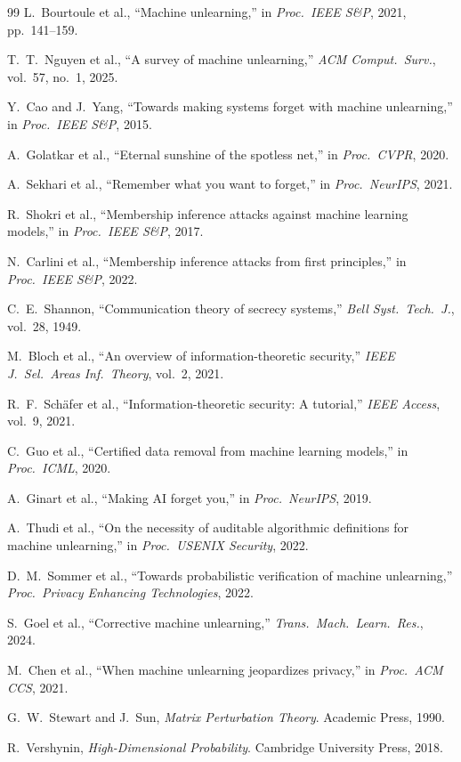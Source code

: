 \documentclass[journal]{IEEEtran}
\theoremstyle{definition}
\begin{document}
\begin{thebibliography}{99}
L.~Bourtoule et al., ``Machine unlearning,'' in \emph{Proc.\ IEEE S\&P}, 2021, pp.~141--159.

T.~T.~Nguyen et al., ``A survey of machine unlearning,'' \emph{ACM Comput.\ Surv.}, vol.~57, no.~1, 2025.

Y.~Cao and J.~Yang, ``Towards making systems forget with machine unlearning,'' in \emph{Proc.\ IEEE S\&P}, 2015.

A.~Golatkar et al., ``Eternal sunshine of the spotless net,'' in \emph{Proc.\ CVPR}, 2020.

A.~Sekhari et al., ``Remember what you want to forget,'' in \emph{Proc.\ NeurIPS}, 2021.

R.~Shokri et al., ``Membership inference attacks against machine learning models,'' in \emph{Proc.\ IEEE S\&P}, 2017.

N.~Carlini et al., ``Membership inference attacks from first principles,'' in \emph{Proc.\ IEEE S\&P}, 2022.

C.~E.~Shannon, ``Communication theory of secrecy systems,'' \emph{Bell Syst.\ Tech.\ J.}, vol.~28, 1949.

M.~Bloch et al., ``An overview of information-theoretic security,'' \emph{IEEE J.\ Sel.\ Areas Inf.\ Theory}, vol.~2, 2021.

R.~F.~Sch\"{a}fer et al., ``Information-theoretic security: A tutorial,'' \emph{IEEE Access}, vol.~9, 2021.

C.~Guo et al., ``Certified data removal from machine learning models,'' in \emph{Proc.\ ICML}, 2020.

A.~Ginart et al., ``Making AI forget you,'' in \emph{Proc.\ NeurIPS}, 2019.

A.~Thudi et al., ``On the necessity of auditable algorithmic definitions for machine unlearning,'' in \emph{Proc.\ USENIX Security}, 2022.

D.~M.~Sommer et al., ``Towards probabilistic verification of machine unlearning,'' \emph{Proc.\ Privacy Enhancing Technologies}, 2022.

S.~Goel et al., ``Corrective machine unlearning,'' \emph{Trans.\ Mach.\ Learn.\ Res.}, 2024.

M.~Chen et al., ``When machine unlearning jeopardizes privacy,'' in \emph{Proc.\ ACM CCS}, 2021.

G.~W.~Stewart and J.~Sun, \emph{Matrix Perturbation Theory}. Academic Press, 1990.

R.~Vershynin, \emph{High-Dimensional Probability}. Cambridge University Press, 2018.

\end{thebibliography}
\end{document}
